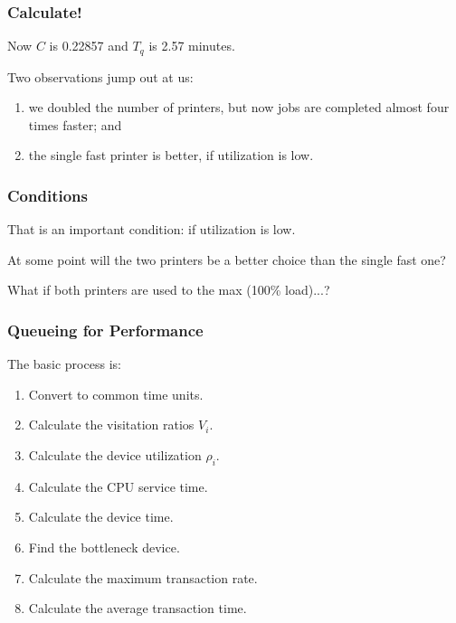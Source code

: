 \begin{frame}
\frametitle{Calculate!}

\large
\begin{changemargin}{1.5cm}
Now $C$ is 0.22857 and $T_{q}$ is 2.57 minutes. 

Two observations jump out at us: \\[0em]
\begin{enumerate}
\item we doubled the number of printers, but now jobs are completed almost four times faster; and 
\item the single fast printer is better, if utilization is low.
\end{enumerate}
\end{changemargin}
\end{frame}



\begin{frame}
\frametitle{Conditions}

\large
\begin{changemargin}{1.5cm}
That is an important condition: if utilization is low. 

At some point will the two printers be a better choice than the single fast one? 

What if both printers are used to the max (100\% load)...?
\end{changemargin}

\end{frame}



\begin{frame}
\frametitle{Queueing for Performance}

\large
\begin{changemargin}{1.5cm}
The basic process is:

\begin{enumerate}
	\item Convert to common time units.
	\item Calculate the visitation ratios $V_{i}$.
	\item Calculate the device utilization $\rho_{i}$.
	\item Calculate the CPU service time.
	\item Calculate the device time.
	\item Find the bottleneck device.
	\item Calculate the maximum transaction rate.
	\item Calculate the average transaction time.
\end{enumerate}
\end{changemargin}
\end{frame}



